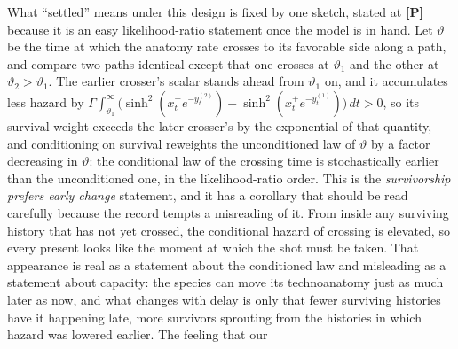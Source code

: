 What ``settled'' means under this design is fixed by one sketch,
stated at \textbf{[P]} because it is an easy likelihood-ratio
statement once the model is in hand. Let $\vartheta$ be the time at which
the anatomy rate crosses to its favorable side along a path, and compare
two paths identical except that one crosses at $\vartheta_1$ and the other
at $\vartheta_2>\vartheta_1$. The earlier crosser's scalar stands ahead from
$\vartheta_1$ on, and it accumulates less hazard by
$\Gamma\!\int_{\vartheta_1}^{\infty}\bigl(\sinh^2(x_t^+e^{-y^{(2)}_t})
-\sinh^2(x_t^+e^{-y^{(1)}_t})\bigr)\,dt>0$, so its survival weight
exceeds the later crosser's by the exponential of that quantity, and
conditioning on survival reweights the unconditioned law of $\vartheta$
by a factor decreasing in $\vartheta$: the conditional law of the
crossing time is stochastically earlier than the unconditioned one,
in the likelihood-ratio order. This is the \emph{survivorship prefers
early change} statement, and it has a corollary that should be read
carefully because the record tempts a misreading of it. From inside
any surviving history that has not yet crossed, the conditional
hazard of crossing is elevated, so every present looks like the
moment at which the shot must be taken. That appearance is real as a
statement about the conditioned law and misleading as a statement
about capacity: the species can move its technoanatomy just as much later as
now, and what changes with delay is only that fewer surviving
histories have it happening late, more survivors sprouting from the
histories in which hazard was lowered earlier. The feeling that our
